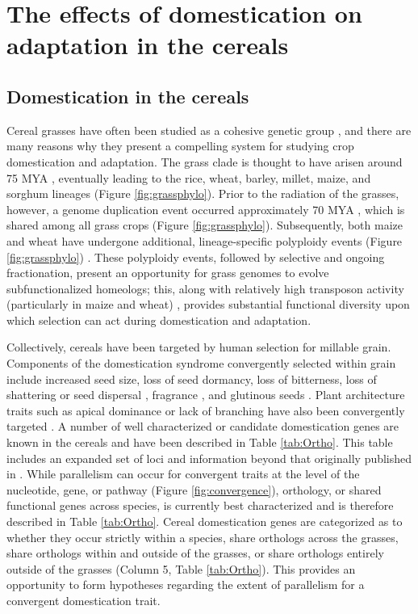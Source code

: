 \documentclass[12pt]{article}
\begin{document}
\paragraph{}

\section*{The effects of domestication on adaptation in the cereals}

\subsection*{Domestication in the cereals}
Cereal grasses have often been studied as a cohesive genetic group \citep{pmid8379002, pmid11244100}, and there are many reasons why they present a compelling system for studying crop domestication and adaptation.
The grass clade is thought to have arisen around 75 MYA \citep{BOUCHENAKKHELLADI2010, Kellogg2001}, eventually leading to the rice, wheat, barley, millet, maize, and sorghum lineages (Figure \ref{fig:grassphylo}).
Prior to the radiation of the grasses, however, a genome duplication event occurred approximately 70 MYA \citep{Paterson2004}, which is shared among all grass crops (Figure \ref{fig:grassphylo}).
Subsequently, both maize and wheat have undergone additional, lineage-specific polyploidy events (Figure \ref{fig:grassphylo}) \citep{Levy2002}.
These polyploidy events, followed by selective and ongoing fractionation, present an opportunity for grass genomes to evolve subfunctionalized homeologs; this, along with relatively high transposon activity (particularly in maize and wheat) \citep{Wicker2016, Lisch2001}, provides substantial functional diversity upon which selection can act during domestication and adaptation.

Collectively, cereals have been targeted by human selection for millable grain.
Components of the domestication syndrome convergently selected within grain include increased seed size, loss of seed dormancy, loss of bitterness, loss of shattering or seed dispersal \citep{Lenser2013}, fragrance \citep{Kellogg2001}, and glutinous seeds \citep{Meyer2013}.
Plant architecture traits such as apical dominance or lack of branching have also been convergently targeted \citep{Lenser2013}.
A number of well characterized or candidate domestication genes are known in the cereals and have been described in Table \ref{tab:Ortho}.
This table includes an expanded set of loci and information beyond that originally published in \citep{Lenser2013}. 
While parallelism can occur for convergent traits at the level of the nucleotide, gene, or pathway  (Figure \ref{fig:convergence}), orthology, or shared functional genes across species, is currently best characterized and is therefore described in Table \ref{tab:Ortho}.
Cereal domestication genes are categorized as to whether they occur strictly within a species, share orthologs across the grasses, share orthologs within and outside of the grasses, or share orthologs entirely outside of the grasses (Column 5, Table \ref{tab:Ortho}). 
This provides an opportunity to form hypotheses regarding the extent of parallelism for a convergent domestication trait. 
\end{document}

